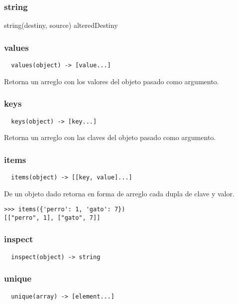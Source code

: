 \subsubsection*{string}
string(destiny, source) \rightarrow alteredDestiny

\subsubsection*{values}
\begin{verbatim}
  values(object) -> [value...]
\end{verbatim}
Retorna un arreglo con los valores del objeto pasado como argumento.

\subsubsection*{keys}
\begin{verbatim}
  keys(object) -> [key...]
\end{verbatim}
Retorna un arreglo con las claves del objeto pasado como argumento.

\subsubsection*{items}
\begin{verbatim}
  items(object) -> [[key, value]...]
\end{verbatim}
De un objeto dado retorna en forma de arreglo cada dupla de clave y valor.
\begin{lstlisting}[style=consola]
>>> items({'perro': 1, 'gato': 7})
[["perro", 1], ["gato", 7]]
\end{lstlisting}

\subsubsection*{inspect}
\begin{verbatim}
  inspect(object) -> string
\end{verbatim}

\subsubsection*{unique}
\begin{verbatim}
  unique(array) -> [element...]
\end{verbatim}

